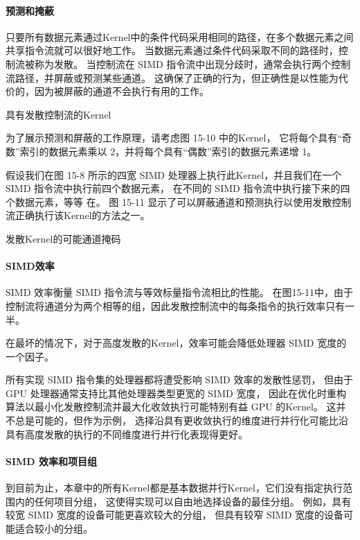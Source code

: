 \paragraph{预测和掩蔽}

只要所有数据元素通过Kernel中的条件代码采用相同的路径，在多个数据元素之间共享指令流就可以很好地工作。 
当数据元素通过条件代码采取不同的路径时，控制流被称为发散。 
当控制流在 SIMD 指令流中出现分歧时，通常会执行两个控制流路径，并屏蔽或预测某些通道。 
这确保了正确的行为，但正确性是以性能为代价的，因为被屏蔽的通道不会执行有用的工作。

{\color{red} 具有发散控制流的Kernel}

为了展示预测和屏蔽的工作原理，请考虑图 15-10 中的Kernel，
它将每个具有“奇数”索引的数据元素乘以 2，并将每个具有“偶数”索引的数据元素递增 1。

假设我们在图 15-8 所示的四宽 SIMD 处理器上执行此Kernel，并且我们在一个 SIMD 指令流中执行前四个数据元素，
在不同的 SIMD 指令流中执行接下来的四个数据元素，等等 在。 
图 15-11 显示了可以屏蔽通道和预测执行以使用发散控制流正确执行该Kernel的方法之一。

{\color{red} 发散Kernel的可能通道掩码}

\paragraph{SIMD效率}

SIMD 效率衡量 SIMD 指令流与等效标量指令流相比的性能。 
在图15-11中，由于控制流将通道分为两个相等的组，因此发散控制流中的每条指令的执行效率只有一半。

在最坏的情况下，对于高度发散的Kernel，效率可能会降低处理器 SIMD 宽度的一个因子。

所有实现 SIMD 指令集的处理器都将遭受影响 SIMD 效率的发散性惩罚，
但由于 GPU 处理器通常支持比其他处理器类型更宽的 SIMD 宽度，
因此在优化时重构算法以最小化发散控制流并最大化收敛执行可能特别有益 GPU 的Kernel。 
这并不总是可能的，但作为示例，
选择沿具有更收敛执行的维度进行并行化可能比沿具有高度发散的执行的不同维度进行并行化表现得更好。

\paragraph{SIMD 效率和项目组}

到目前为止，本章中的所有Kernel都是基本数据并行Kernel，它们没有指定执行范围内的任何项目分组，
这使得实现可以自由地选择设备的最佳分组。 例如，具有较宽 SIMD 宽度的设备可能更喜欢较大的分组，
但具有较窄 SIMD 宽度的设备可能适合较小的分组。

